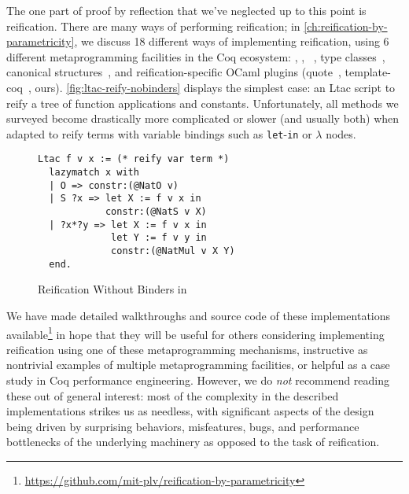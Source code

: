 The one part of proof by reflection that we've neglected up to this point is reification.
There are many ways of performing reification; in \autoref{ch:reification-by-parametricity}, we discuss 18 different ways of implementing reification, using 6 different metaprogramming facilities in the Coq ecosystem: \Ltac, \LtacTwo, \Mtac~\cite{lessadhoc,Mtac2}, type classes~\cite{sozeau2008first}, canonical structures~\cite{gonthier2016small}, and reification-specific OCaml plugins (quote~\cite{quote-plugin}, template-coq~\cite{TemplateCoq}, ours).
\autoref{fig:ltac-reify-nobinders} displays the simplest case: an Ltac script to reify a tree of function applications and constants.
Unfortunately, all methods we surveyed become drastically more complicated or slower (and usually both) when adapted to reify terms with variable bindings such as \texttt{let}-\texttt{in} or \texttt{$\lambda$} nodes.

\begin{wrapfigure}[10]{r}{6.4cm}
\begin{verbatim}
Ltac f v x := (* reify var term *)
  lazymatch x with
  | O => constr:(@NatO v)
  | S ?x => let X := f v x in
            constr:(@NatS v X)
  | ?x*?y => let X := f v x in
             let Y := f v y in
             constr:(@NatMul v X Y)
  end.
\end{verbatim}
\caption{Reification Without Binders in \Ltac}\label{fig:ltac-reify-nobinders}
\end{wrapfigure}

We have made detailed walkthroughs and source code of these implementations available\footnote{\url{https://github.com/mit-plv/reification-by-parametricity}} in hope that they will be useful for others considering implementing reification using one of these metaprogramming mechanisms, instructive as nontrivial examples of multiple metaprogramming facilities, or helpful as a case study in Coq performance engineering.
However, we do \emph{not} recommend reading these out of general interest:
most of the complexity in the described implementations strikes us as needless,
with significant aspects of the design being driven by surprising behaviors, misfeatures, bugs, and performance bottlenecks of the underlying machinery as opposed to the task of reification.

